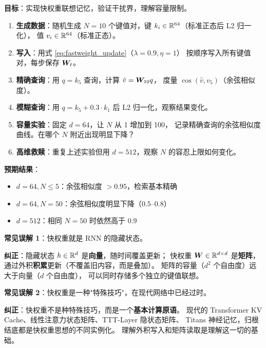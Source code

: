 \begin{labbox}[title=Lab 4：手写外积联想记忆并分析干扰]
\textbf{目标}：实现快权重联想记忆，验证干扰界，理解容量限制。

\begin{enumerate}
  \item \textbf{生成数据}：随机生成 $N=10$ 个键值对，键 $k_i \in \mathbb{R}^{64}$（标准正态后 L2 归一化），
        值 $v_i \in \mathbb{R}^{64}$（标准正态）。

  \item \textbf{写入}：用式 \eqref{eq:fastweight_update}（$\lambda=0.9, \eta=1$）
        按顺序写入所有键值对，每步保存 $\boldsymbol{W}_t$。

  \item \textbf{精确查询}：用 $q = k_5$ 查询，计算 $\hat{v} = \boldsymbol{W}_{10} q$，
        度量 $\cos(\hat{v}, v_5)$（余弦相似度）。

  \item \textbf{模糊查询}：用 $q = k_5 + 0.3 \cdot k_1$ 后 L2 归一化，观察结果变化。

  \item \textbf{容量实验}：固定 $d=64$，让 $N$ 从 1 增加到 100，
        记录精确查询的余弦相似度曲线。在哪个 $N$ 附近出现明显下降？

  \item \textbf{高维救赎}：重复上述实验但用 $d=512$，观察 $N$ 的容忍上限如何变化。
\end{enumerate}

\textbf{预期结果}：
\begin{itemize}
  \item $d=64, N \le 5$：余弦相似度 $> 0.95$，检索基本精确
  \item $d=64, N = 50$：余弦相似度明显下降（$0.5$--$0.8$）
  \item $d=512$：相同 $N=50$ 时依然高于 $0.9$
\end{itemize}
\end{labbox}

\begin{misconceptionbox}
\textbf{常见误解 1}：快权重就是 RNN 的隐藏状态。

\textbf{纠正}：隐藏状态 $h \in \mathbb{R}^d$ 是\textbf{向量}，随时间覆盖更新；
快权重 $\boldsymbol{W} \in \mathbb{R}^{d \times d}$ 是\textbf{矩阵}，通过外积\textbf{积累}更新（不覆盖旧内容，而是叠加）。
矩阵的容量（$d^2$ 个自由度）远大于向量（$d$ 个自由度），
可以同时存储多个独立的键值联想。
\end{misconceptionbox}

\begin{misconceptionbox}
\textbf{常见误解 2}：快权重是一种"特殊技巧"，在现代网络中已经过时。

\textbf{纠正}：快权重不是种特殊技巧，而是一个\textbf{基本计算原语}。
现代的 Transformer KV Cache、线性注意力状态矩阵、TTT-Layer 隐状态矩阵、
Titans 神经记忆，归根结底都是快权重思想的不同实例化。
理解外积写入和矩阵读取是理解这一切的基础。
\end{misconceptionbox}

